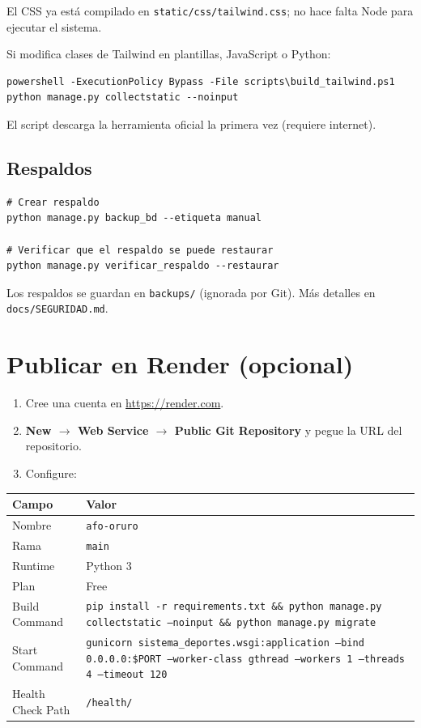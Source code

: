 \documentclass[11pt,a4paper]{article}
\newcommand{\campo}[1]{\texttt{\small #1}}
\begin{document}
El CSS ya está compilado en \campo{static/css/tailwind.css}; no hace falta Node
para ejecutar el sistema.

Si modifica clases de Tailwind en plantillas, JavaScript o Python:

\begin{lstlisting}
powershell -ExecutionPolicy Bypass -File scripts\build_tailwind.ps1
python manage.py collectstatic --noinput
\end{lstlisting}

El script descarga la herramienta oficial la primera vez (requiere internet).

\subsection{Respaldos}

\begin{lstlisting}
# Crear respaldo
python manage.py backup_bd --etiqueta manual

# Verificar que el respaldo se puede restaurar
python manage.py verificar_respaldo --restaurar
\end{lstlisting}

Los respaldos se guardan en \campo{backups/} (ignorada por Git). Más detalles en
\campo{docs/SEGURIDAD.md}.

\section{Publicar en Render (opcional)}

\begin{enumerate}[leftmargin=1.4em]
  \item Cree una cuenta en \url{https://render.com}.
  \item \textbf{New $\rightarrow$ Web Service $\rightarrow$ Public Git Repository}
        y pegue la URL del repositorio.
  \item Configure:
\end{enumerate}

\begin{tabularx}{\textwidth}{@{}l X@{}}
\toprule
\textbf{Campo} & \textbf{Valor}\\
\midrule
Nombre & \campo{afo-oruro}\\
Rama & \campo{main}\\
Runtime & Python 3\\
Plan & Free\\
Build Command & \campo{pip install -r requirements.txt \&\& python manage.py collectstatic --noinput \&\& python manage.py migrate}\\
Start Command & \campo{gunicorn sistema\_deportes.wsgi:application --bind 0.0.0.0:\$PORT --worker-class gthread --workers 1 --threads 4 --timeout 120}\\
Health Check Path & \campo{/health/}\\
\bottomrule
\end{tabularx}
\end{document}
